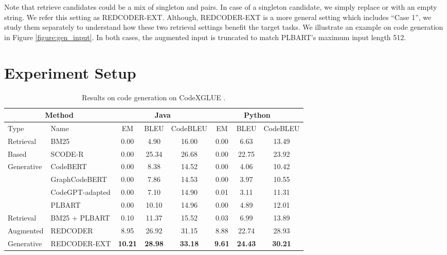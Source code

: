 \documentclass[11pt]{article}
\newcommand{\tool}{{REDCODER}\xspace}
\newcommand{\toolext}{{REDCODER-EXT}\xspace}
\newcommand{\toolextnospace}{REDCODER-EXT}
\newcommand{\coder}{SCODE-R\xspace}
\begin{document}
Note that retrieve candidates could be a mix of singleton and pairs. In case of a singleton candidate, we simply replace 
or  
with an empty string.
We refer this setting as \toolextnospace. 
Although, \toolext is a more general setting which includes ``Case 1'', we study them separately to understand how these two retrieval settings benefit the target tasks.
We illustrate an example on code generation in Figure \ref{figure:gen_input}.
In both cases, the augmented input 
is truncated to match PLBART's maximum input length 512.






 \section{Experiment Setup}
\label{sec:exp_setup}




\begin{table*}[h]
\centering
\begin{tabular}{l|l|c c c|c c c}
\hline
\multicolumn{2}{c|}{Method} & \multicolumn{3}{c|}{Java}& \multicolumn{3}{c}{Python}\\
\hline
Type & Name & EM & BLEU & CodeBLEU & EM & BLEU & CodeBLEU \\
\hline
Retrieval & BM25 &  0.00 & 4.90 & 16.00 & 0.00 & 6.63 & 13.49 \\
Based & \coder  & 0.00 & 25.34  & 26.68 & 0.00 & {22.75} &  23.92  \\
\hline
\multirow{4}{*}{Generative} & CodeBERT & 0.00 & 8.38 & 14.52 & 0.00 & 4.06 & 10.42\\
& GraphCodeBERT & 0.00 & 7.86 & 14.53 & 0.00 & 3.97 & 10.55\\
& CodeGPT-adapted & 0.00 & 7.10 & 14.90 & 0.01 & 3.11 & 11.31 \\ 
& PLBART &  0.00 & 10.10 & 14.96 & 0.00 & 4.89  & 12.01  \\
\hline
Retrieval & BM25 + PLBART  & 0.10 & 11.37 & 15.52 & 0.03 & 6.99   & 13.89 \\
Augmented & \tool   & {8.95} & { 26.92}  & {31.15} & { 8.88} & { 22.74}  & {28.93}   \\
Generative & \toolext & {\bf 10.21} & {\bf 28.98}   & {\bf 33.18} & {\bf 9.61} & {\bf 24.43} &  {\bf 30.21} \\
\hline 
\end{tabular}
\caption{
Results on code generation on CodeXGLUE \cite{CodeXGLUE}.
}
\label{table:csnet_gen}
\vspace{-2mm}
\end{table*}
\end{document}
